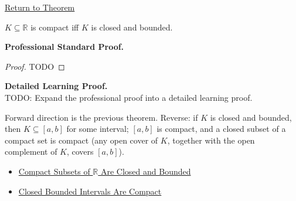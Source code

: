\newpage
{}
\label{prf:heine-borel}

\begin{remark*}[Return]
\hyperref[thm:heine-borel]{Return to Theorem}
\end{remark*}

\begin{theorem*}
$K\subseteq\mathbb{R}$ is compact iff $K$ is closed and bounded.
\end{theorem*}

\textbf{Professional Standard Proof.}~\\
\begin{proof}
TODO
\end{proof}

\textbf{Detailed Learning Proof.}~\\
TODO: Expand the professional proof into a detailed learning proof.

\begin{remark*}
Forward direction is the previous theorem. Reverse: if $K$ is closed and bounded, then $K\subseteq[a,b]$ for some interval; $[a,b]$ is compact, and a closed subset of a compact set is compact (any open cover of $K$, together with the open complement of $K$, covers $[a,b]$).
\end{remark*}

\begin{dependencies}
\begin{itemize}
  \item \hyperref[thm:compact-implies-closed-bounded]{Compact Subsets of $\mathbb{R}$ Are Closed and Bounded}
  \item \hyperref[thm:closed-bounded-interval-compact]{Closed Bounded Intervals Are Compact}
\end{itemize}
\end{dependencies}
